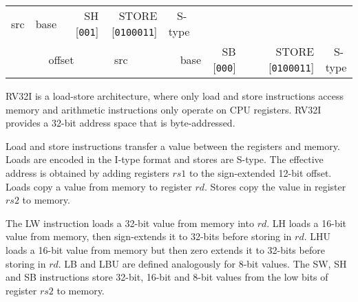 \documentclass{article}
\begin{document}
\begin{table}[H]
\begin{center}
\begin{tabular}{ccccccccccccccccccccccccccccccccc}
        \multicolumn{5}{|r|}{src} &
        \multicolumn{5}{|r|}{base} &
        \multicolumn{3}{|r|}{SH [\texttt{001}]} &
        \multicolumn{7}{|r|}{STORE [\texttt{0100011}]} &
        \ \tiny{S-type}
        \\
        \cline{1-32}
        \multicolumn{12}{|r|}{offset} &
        \multicolumn{5}{|r|}{src} &
        \multicolumn{5}{|r|}{base} &
        \multicolumn{3}{|r|}{SB [\texttt{000}]} &
        \multicolumn{7}{|r|}{STORE [\texttt{0100011}]} &
        \ \tiny{S-type}
        \\
        \cline{1-32}
    \end{tabular}
    \end{center}
\end{table}

RV32I is a load-store architecture, where only load and store instructions access memory and arithmetic instructions only operate on CPU registers. RV32I provides a 32-bit address space that is byte-addressed.

Load and store instructions transfer a value between the registers and memory. Loads are encoded in the I-type format and stores are S-type. The effective address is obtained by adding registers $rs1$ to the sign-extended 12-bit offset. Loads copy a value from memory to register $rd$. Stores copy the value in register $rs2$ to memory.

The LW instruction loads a 32-bit value from memory into $rd$. LH loads a 16-bit value from memory, then sign-extends it to 32-bits before storing in $rd$. LHU loads a 16-bit value from memory but then zero extends it to 32-bits before storing in $rd$. LB and LBU are defined analogously for 8-bit values. The SW, SH and SB instructions store 32-bit, 16-bit and 8-bit values from the low bits of register $rs2$ to memory.
\end{document}

